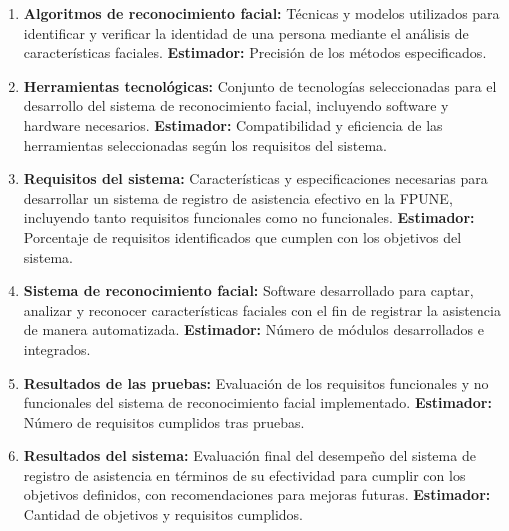 \begin{enumerate}
    \item \textbf{Algoritmos de reconocimiento facial:} Técnicas y modelos utilizados para identificar y verificar la identidad de una persona mediante el análisis de características faciales. \textbf{Estimador:} Precisión de los métodos especificados.

    \item \textbf{Herramientas tecnológicas:} Conjunto de tecnologías seleccionadas para el desarrollo del sistema de reconocimiento facial, incluyendo software y hardware necesarios. \textbf{Estimador:} Compatibilidad y eficiencia de las herramientas seleccionadas según los requisitos del sistema.

    \item \textbf{Requisitos del sistema:} Características y especificaciones necesarias para desarrollar un sistema de registro de asistencia efectivo en la FPUNE, incluyendo tanto requisitos funcionales como no funcionales. \textbf{Estimador:} Porcentaje de requisitos identificados que cumplen con los objetivos del sistema.

    \item \textbf{Sistema de reconocimiento facial:} Software desarrollado para captar, analizar y reconocer características faciales con el fin de registrar la asistencia de manera automatizada. \textbf{Estimador:} Número de módulos desarrollados e integrados.

    \item \textbf{Resultados de las pruebas:} Evaluación de los requisitos funcionales y no funcionales del sistema de reconocimiento facial implementado. \textbf{Estimador:} Número de requisitos cumplidos tras pruebas.

    \item \textbf{Resultados del sistema:} Evaluación final del desempeño del sistema de registro de asistencia en términos de su efectividad para cumplir con los objetivos definidos, con recomendaciones para mejoras futuras. \textbf{Estimador:} Cantidad de objetivos y requisitos cumplidos.
\end{enumerate}


